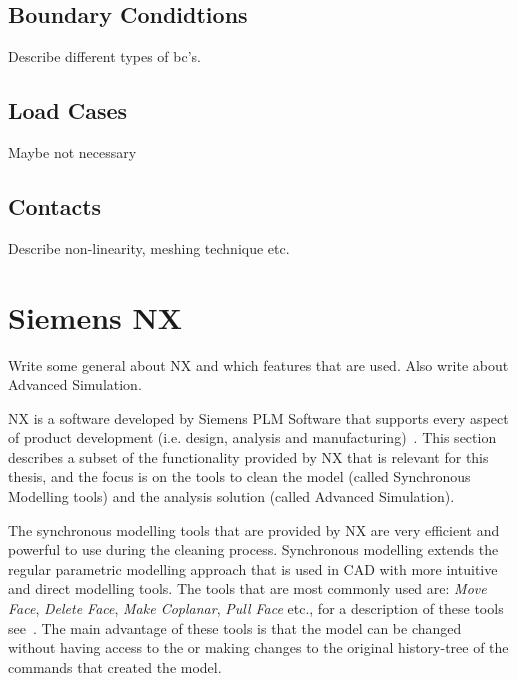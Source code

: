 \subsection{Boundary Condidtions} %
\label{sub:boundary_condidtions}
Describe different types of bc's.

\subsection{Load Cases} %
\label{sub:load_cases}
Maybe not necessary

\subsection{Contacts} %
\label{sub:contacts}
Describe non-linearity, meshing technique etc.


\section{Siemens NX} %
\label{sec:siemens_nx}
Write some general about NX and which features that are used. Also write about Advanced Simulation.

NX\texttrademark{} is a software developed by Siemens PLM Software that supports every aspect of product development (i.e. design, analysis and manufacturing)~\cite{siemensnx}. This section describes a subset of the functionality provided by NX that is relevant for this thesis, and the focus is on the tools to clean the model (called Synchronous Modelling  tools) and the analysis solution (called Advanced Simulation).~\cite[p.~36ff.]{goncharov14}

The synchronous modelling tools that are provided by NX are very efficient and powerful to use during the cleaning process. Synchronous modelling extends the regular parametric modelling approach that is used in CAD with more intuitive and direct modelling tools. The tools that are most commonly used are: \textit{Move Face}, \textit{Delete Face}, \textit{Make Coplanar}, \textit{Pull Face} etc., for a description of these tools see~\cite{goncharov14}. The main advantage of these tools is that the model can be changed without having access to the or making changes to the original history-tree of the commands that created the model.

